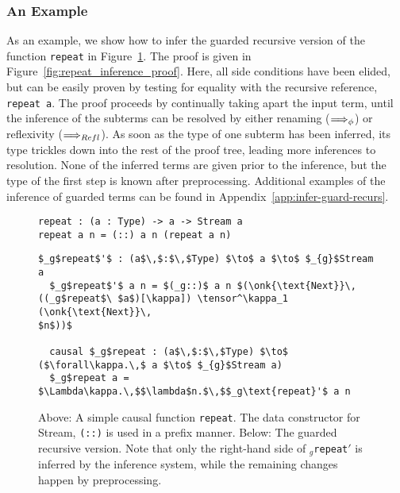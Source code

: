 \subsubsection{An Example}
As an example, we show how to infer the guarded recursive version of the
function \texttt{repeat} in Figure~\ref{fig:repeat_proof_example_program}. The
proof is given in Figure~\ref{fig:repeat_inference_proof}. Here, all side
conditions have been elided, but can be easily proven by testing for equality
with the recursive reference, \texttt{repeat a}. The proof proceeds by
continually taking apart the input term, until the inference of the subterms can
be resolved by either renaming ($\Longrightarrow_\phi$) or reflexivity
($\Longrightarrow_{Refl}$). As soon as the type of one subterm has been inferred, its
type trickles down into the rest of the proof tree, leading more inferences to
resolution. None of the inferred terms are given prior to the inference, but the
type of the first step is known after preprocessing. Additional examples of the
inference of guarded terms can be found in Appendix~\ref{app:infer-guard-recurs}.


\begin{figure}[h]
\begin{lstlisting}[mathescape]
repeat : (a : Type) -> a -> Stream a
repeat a n = (::) a n (repeat a n)
\end{lstlisting}
\begin{lstlisting}[mathescape]
  $_g$repeat$'$ : (a$\,$:$\,$Type) $\to$ a $\to$ $_{g}$Stream a
  $_g$repeat$'$ a n = $(_g::)$ a n $(\onk{\text{Next}}\,((_g$repeat$\ $a$)[\kappa]) \tensor^\kappa_1 (\onk{\text{Next}}\,
$n$))$

  causal $_g$repeat : (a$\,$:$\,$Type) $\to$ ($\forall\kappa.\,$ a $\to$ $_{g}$Stream a)
  $_g$repeat a = $\Lambda\kappa.\,$$\lambda$n.$\,$$_g\text{repeat}'$ a n
\end{lstlisting}
  \caption{Above: A simple causal function \texttt{repeat}. The data constructor for
    Stream, \texttt{(::)} is used in a prefix manner. Below: The guarded
    recursive version. Note that only the right-hand side of
    \texttt{$_g$repeat$'$} is inferred by the inference system, while the
    remaining changes happen by preprocessing.}
\label{fig:repeat_proof_example_program}
\end{figure}


